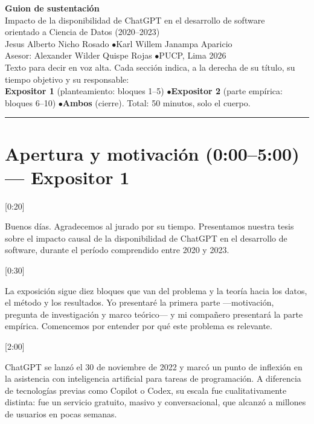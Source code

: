 \documentclass[11pt,a4paper]{article}
\newcommand{\slide}[2]{\par\vspace{0.6em}\noindent{\bfseries\color{pucpaccent}\rule[0.1em]{0.45em}{0.45em}\ #1}\hfill{\small\color{graysoft}[#2]}\par\vspace{0.2em}}
\begin{document}
\begin{center}
{\LARGE\bfseries\color{pucpblue} Guion de sustentación}\\[0.4em]
{\large Impacto de la disponibilidad de ChatGPT en el desarrollo de software\\ orientado a Ciencia de Datos (2020--2023)}\\[0.8em]
{\normalsize Jesus Alberto Nicho Rosado \quad$\bullet$\quad Karl Willem Janampa Aparicio}\\
{\small Asesor: Alexander Wilder Quispe Rojas \quad$\bullet$\quad PUCP, Lima 2026}\\[0.5em]
{\small\color{graysoft} Texto para decir en voz alta. Cada sección indica, a la derecha de su título, su tiempo objetivo y su responsable:}\\
{\small\color{graysoft} \textbf{Expositor 1} (planteamiento: bloques 1--5) \quad$\bullet$\quad \textbf{Expositor 2} (parte empírica: bloques 6--10) \quad$\bullet$\quad \textbf{Ambos} (cierre). Total: 50 minutos, solo el cuerpo.}
\end{center}

\vspace{0.4em}
\hrule

\section{Apertura y motivación \hfill {\normalfont\small\color{graysoft}(0:00--5:00) — Expositor 1}}

\slide{Portada}{0:20}
Buenos días. Agradecemos al jurado por su tiempo. Presentamos nuestra tesis sobre el impacto causal de la disponibilidad de ChatGPT en el desarrollo de software, durante el período comprendido entre 2020 y 2023.

\slide{Agenda}{0:30}
La exposición sigue diez bloques que van del problema y la teoría hacia los datos, el método y los resultados. Yo presentaré la primera parte ---motivación, pregunta de investigación y marco teórico--- y mi compañero presentará la parte empírica. Comencemos por entender por qué este problema es relevante.

\slide{Motivación}{2:00}
ChatGPT se lanzó el 30 de noviembre de 2022 y marcó un punto de inflexión en la asistencia con inteligencia artificial para tareas de programación. A diferencia de tecnologías previas como Copilot o Codex, su escala fue cualitativamente distinta: fue un servicio gratuito, masivo y conversacional, que alcanzó a millones de usuarios en pocas semanas.
\end{document}
